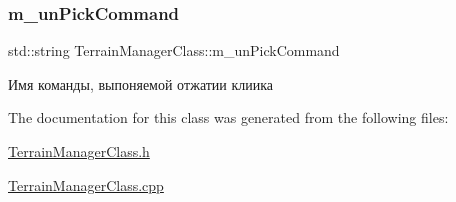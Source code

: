 \subsubsection{\texorpdfstring{m\+\_\+un\+Pick\+Command}{m\_unPickCommand}}
{\footnotesize\ttfamily std\+::string Terrain\+Manager\+Class\+::m\+\_\+un\+Pick\+Command\hspace{0.3cm}{\ttfamily [private]}}



Имя команды, выпоняемой отжатии клиика 



The documentation for this class was generated from the following files\+:\begin{DoxyCompactItemize}
\item 
\hyperlink{_terrain_manager_class_8h}{Terrain\+Manager\+Class.\+h}\item 
\hyperlink{_terrain_manager_class_8cpp}{Terrain\+Manager\+Class.\+cpp}\end{DoxyCompactItemize}
